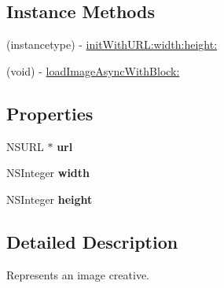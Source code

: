 \subsection*{Instance Methods}
\begin{DoxyCompactItemize}
\item 
(instancetype) -\/ \hyperlink{interface_f_b_ad_image_a9c3ac84702a27cf8e70648dde37de67f}{init\-With\-U\-R\-L\-:width\-:height\-:}
\item 
(void) -\/ \hyperlink{interface_f_b_ad_image_ad31ea304124f0f7f698018152a413789}{load\-Image\-Async\-With\-Block\-:}
\end{DoxyCompactItemize}
\subsection*{Properties}
\begin{DoxyCompactItemize}
\item 
\hypertarget{interface_f_b_ad_image_a467e58f11377dcc2887a2baa317a2634}{N\-S\-U\-R\-L $\ast$ {\bfseries url}}\label{interface_f_b_ad_image_a467e58f11377dcc2887a2baa317a2634}

\item 
\hypertarget{interface_f_b_ad_image_ae629999a10c7edb0f87cb0e6dca327ab}{N\-S\-Integer {\bfseries width}}\label{interface_f_b_ad_image_ae629999a10c7edb0f87cb0e6dca327ab}

\item 
\hypertarget{interface_f_b_ad_image_a782a6ddd7f673a8ea078c08ca9cae474}{N\-S\-Integer {\bfseries height}}\label{interface_f_b_ad_image_a782a6ddd7f673a8ea078c08ca9cae474}

\end{DoxyCompactItemize}


\subsection{Detailed Description}
Represents an image creative. 

